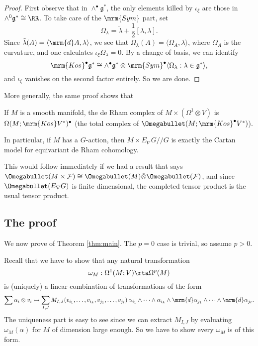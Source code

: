 \begin{proof}
First observe that in $\wedge^\bullet \mathfrak{g}^*$, the only elements killed by $\iota_\xi$ are those in $\wedge^0 \mathfrak{g}^* \cong \RR$. To take care of the $\mrm{Sym}$ part, set
  \[
    \Omega_\lambda = \tilde{\lambda} + \frac{1}{2}[\lambda, \lambda].
  \]
  Since $\tilde{\lambda}(A) = \langle \mrm{d} A, \lambda\rangle$, we see that $\Omega_\lambda(A) = \langle \Omega_A, \lambda\rangle$, where $\Omega_A$ is the curvature, and one calculates $\iota_\xi \Omega_\lambda = 0$. By a change of basis, we can identify
  \[
    \mrm{Kos}^\bullet \mathfrak{g}^* \cong \wedge^\bullet \mathfrak{g}^* \otimes \mrm{Sym}^\bullet \langle \Omega_\lambda: \lambda \in \mathfrak{g}^*\rangle,
  \]
  and $\iota_\xi$ vanishes on the second factor entirely. So we are done.
\end{proof}

More generally, the same proof shows that
\begin{thm}
  If $M$ is a smooth manifold, the de Rham complex of $M \times (\Omega^1 \otimes V)$ is $\Omega(M; \mrm{Kos} V^*)^\bullet$ (the total complex of $\Omegabullet(M; \mrm{Kos}^\bullet V^*)$).

  In particular, if $M$ has a $G$-action, then $M \times E_\nabla G // G$ is exactly the Cartan model for equivariant de Rham cohomology.
\end{thm}
This would follow immediately if we had a result that says $\Omegabullet(M \times \mathcal{F}) \cong \Omegabullet(M) \hat{\otimes} \Omegabullet (\mathcal{F})$, and since $\Omegabullet(E_\nabla G)$ is finite dimensional, the completed tensor product is the usual tensor product.

\subsection{The proof}\label{section:proof}
We now prove of Theorem \ref{thm:main}. The $p = 0$ case is trivial, so assume $p > 0$.

Recall that we have to show that any natural transformation
\[
  \omega_M: \Omega^1(M; V) \rta \Omega^p(M)
\]
is (uniquely) a linear combination of transformations of the form
\[
  \sum \alpha_i \otimes v_i \mapsto \sum_{I, J} M_{I, J}(v_{i_1}, \ldots, v_{i_k}, v_{j_1}, \ldots, v_{j_\ell})\, \alpha_{i_1} \wedge \cdots \wedge \alpha_{i_k} \wedge \mrm{d} \alpha_{j_1} \wedge \cdots \wedge \mrm{d} \alpha_{j_\ell}.
\]
The uniqueness part is easy to see since we can extract $M_{I, J}$ by evaluating $\omega_M(\alpha)$ for $M$ of dimension large enough. So we have to show every $\omega_M$ is of this form.

